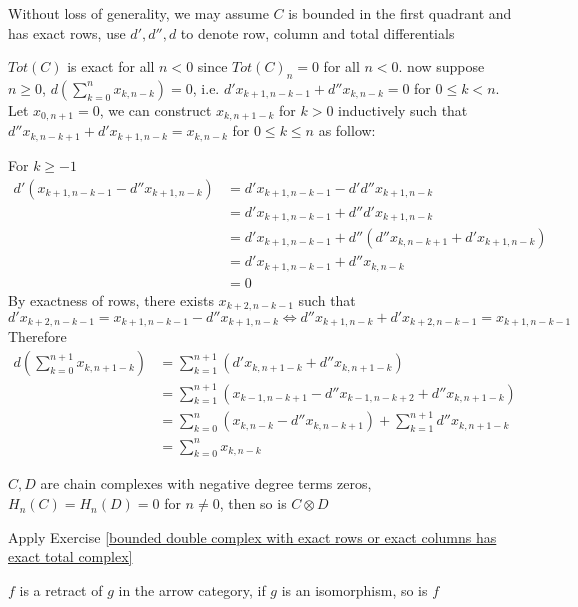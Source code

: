 \documentclass[main]{subfiles}
\begin{document}
\begin{solution}
Without loss of generality, we may assume $C$ is bounded in the first quadrant and has exact rows, use $d',d'',d$ to denote row, column and total differentials \par
$Tot(C)$ is exact for all $n<0$ since $Tot(C)_n=0$ for all $n<0$. now suppose $n\geq 0$, $\displaystyle d\left(\sum_{k=0}^n x_{k,n-k}\right)=0$, i.e. $d'x_{k+1,n-k-1}+d''x_{k,n-k}=0$ for $0\leq k<n$. Let $x_{0,n+1}=0$, we can construct $x_{k,n+1-k}$ for $k>0$ inductively such that $d''x_{k,n-k+1}+d'x_{k+1,n-k}=x_{k,n-k}$ for $0\leq k\leq n$ as follow: \par
For $k\geq -1$
\begin{align*}
d'(x_{k+1,n-k-1}-d''x_{k+1,n-k})&=d'x_{k+1,n-k-1}-d'd''x_{k+1,n-k} \\
&=d'x_{k+1,n-k-1}+d''d'x_{k+1,n-k} \\
&=d'x_{k+1,n-k-1}+d''(d''x_{k,n-k+1}+d'x_{k+1,n-k}) \\
&=d'x_{k+1,n-k-1}+d''x_{k,n-k} \\
&=0
\end{align*}
By exactness of rows, there exists $x_{k+2,n-k-1}$ such that
\[d'x_{k+2,n-k-1}=x_{k+1,n-k-1}-d''x_{k+1,n-k}\Leftrightarrow d''x_{k+1,n-k}+d'x_{k+2,n-k-1}=x_{k+1,n-k-1}\]
Therefore
\begin{align*}
d\left(\sum_{k=0}^{n+1} x_{k,n+1-k}\right)&=\sum_{k=1}^{n+1} (d'x_{k,n+1-k}+d''x_{k,n+1-k}) \\
&=\sum_{k=1}^{n+1} (x_{k-1,n-k+1}-d''x_{k-1,n-k+2}+d''x_{k,n+1-k}) \\
&=\sum_{k=0}^{n} (x_{k,n-k}-d''x_{k,n-k+1})+\sum_{k=1}^{n+1}d''x_{k,n+1-k} \\
&=\sum_{k=0}^{n} x_{k,n-k}
\end{align*}
\end{solution}

\begin{exercise}\label{C,D acyclic => C tensor D acyclic}
$C,D$ are chain complexes with negative degree terms zeros, $H_n(C)=H_n(D)=0$ for $n\neq0$, then so is $C\otimes D$
\end{exercise}

\begin{solution}
Apply Exercise \ref{bounded double complex with exact rows or exact columns has exact total complex}
\end{solution}

\begin{exercise}
$f$ is a retract of $g$ in the arrow category, if $g$ is an isomorphism, so is $f$
\begin{center}
\end{center}
\end{exercise}
\end{document}

